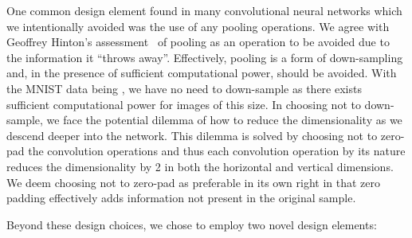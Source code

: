 \documentclass{article}
\begin{document}
One common design element found in many convolutional neural networks which we intentionally avoided was the use of any pooling operations.  We agree with Geoffrey Hinton's assessment~\cite{Hinton2018b} of pooling as an operation to be avoided due to the information it ``throws away''.  Effectively, pooling is a form of down-sampling and, in the presence of sufficient computational power, should be avoided.  With the MNIST data being , we have no need to down-sample as there exists sufficient computational power for images of this size.  In choosing not to down-sample, we face the potential dilemma of how to reduce the dimensionality as we descend deeper into the network.  This dilemma is solved by  choosing not to zero-pad the convolution operations and thus each convolution operation by its nature reduces the dimensionality by 2 in both the horizontal and vertical dimensions.  We deem choosing not to zero-pad as preferable in its own right in that zero padding effectively adds information not present in the original sample.

Beyond these design choices, we chose to employ two novel design elements:
\end{document}

